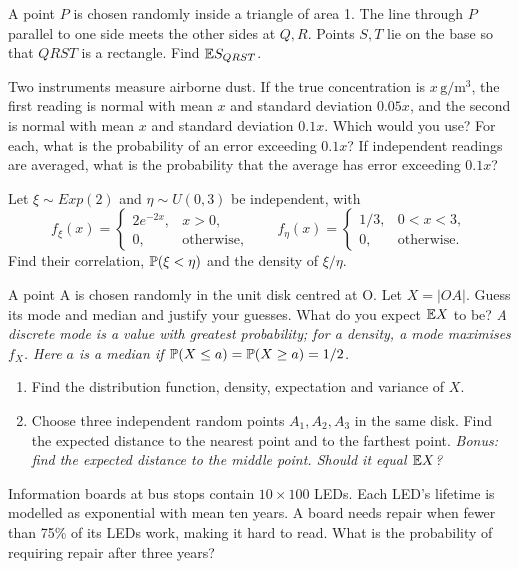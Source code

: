 \documentclass[a4paper]{report}
\begin{document}
\begin{problem}
A point $P$ is chosen randomly inside a triangle of area 1. The line through $P$ parallel to one side meets the other sides at $Q,R$. Points $S,T$ lie on the base so that $QRST$ is a rectangle. Find $\E S_{QRST}$.
\end{problem}
\begin{problempencil}
Two instruments measure airborne dust. If the true concentration is $x\,\mathrm{g/m^3}$, the first reading is normal with mean $x$ and standard deviation $0.05x$, and the second is normal with mean $x$ and standard deviation $0.1x$. Which would you use? For each, what is the probability of an error exceeding $0.1x$? If independent readings are averaged, what is the probability that the average has error exceeding $0.1x$?
\end{problempencil}
\begin{problempencil}
Let $\xi\sim Exp(2)$ and $\eta\sim U(0,3)$ be independent, with
\[f_\xi(x)=\begin{cases}2e^{-2x},&x>0,\\0,&\text{otherwise},\end{cases}\qquad
f_\eta(x)=\begin{cases}1/3,&0<x<3,\\0,&\text{otherwise}.\end{cases}\]
Find their correlation, $\P(\xi<\eta)$ and the density of $\xi/\eta$.
\end{problempencil}
\begin{problempencil}[T2, SE 2020]
A point A is chosen randomly in the unit disk centred at O. Let $X=|OA|$. Guess its mode and median and justify your guesses. What do you expect $\E X$ to be? \textit{A discrete mode is a value with greatest probability; for a density, a mode maximises $f_X$. Here $a$ is a median if $\P(X\le a)=\P(X\ge a)=1/2$.}
\begin{enumerate}
\item Find the distribution function, density, expectation and variance of $X$.
\item Choose three independent random points $A_1,A_2,A_3$ in the same disk. Find the expected distance to the nearest point and to the farthest point. \textit{Bonus: find the expected distance to the middle point. Should it equal $\E X$?}
\end{enumerate}
\end{problempencil}
\begin{problempencil}
Information boards at bus stops contain $10\times100$ LEDs. Each LED's lifetime is modelled as exponential with mean ten years. A board needs repair when fewer than 75\% of its LEDs work, making it hard to read. What is the probability of requiring repair after three years?
\end{problempencil}
\end{document}
